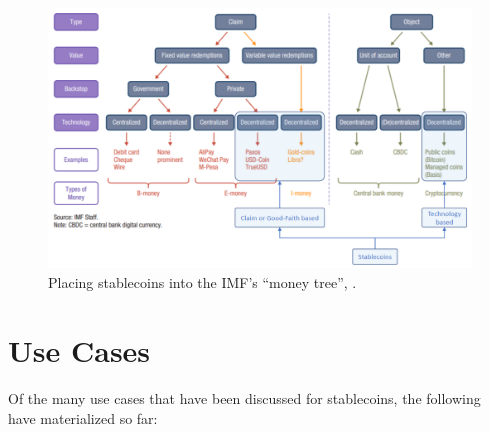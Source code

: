 \documentclass[conference]{IEEEtran}
\begin{document}
\begin{figure}[htbp]
	\centerline{
		\includegraphics[width=\linewidth]{assets/moneyTree.png}
		}
	\caption{Placing stablecoins into the IMF's ``money tree'', \cite{IMF}.}
	\label{fig:monetarytree}
\end{figure}

\section{Use Cases}
\label{sec:usecases}
Of the many use cases that have been discussed for stablecoins, the following have materialized so far:
\end{document}
